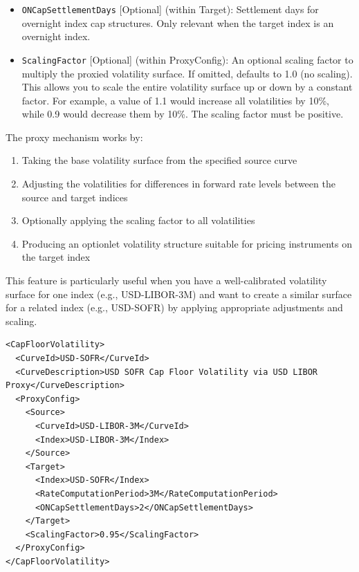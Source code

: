 \begin{itemize}
\item \lstinline!ONCapSettlementDays! [Optional] (within Target):
Settlement days for overnight index cap structures. Only relevant when the target index is an overnight index.

\item \lstinline!ScalingFactor! [Optional] (within ProxyConfig):
An optional scaling factor to multiply the proxied volatility surface. If omitted, defaults to 1.0 (no scaling). This allows you to scale the entire volatility surface up or down by a constant factor. For example, a value of 1.1 would increase all volatilities by 10\%, while 0.9 would decrease them by 10\%. The scaling factor must be positive.

\end{itemize}

The proxy mechanism works by:
\begin{enumerate}
\item Taking the base volatility surface from the specified source curve
\item Adjusting the volatilities for differences in forward rate levels between the source and target indices
\item Optionally applying the scaling factor to all volatilities
\item Producing an optionlet volatility structure suitable for pricing instruments on the target index
\end{enumerate}

This feature is particularly useful when you have a well-calibrated volatility surface for one index (e.g., USD-LIBOR-3M) and want to create a similar surface for a related index (e.g., USD-SOFR) by applying appropriate adjustments and scaling.

\begin{longlisting}
\begin{verbatim}
<CapFloorVolatility>
  <CurveId>USD-SOFR</CurveId>
  <CurveDescription>USD SOFR Cap Floor Volatility via USD LIBOR Proxy</CurveDescription>
  <ProxyConfig>
    <Source>
      <CurveId>USD-LIBOR-3M</CurveId>
      <Index>USD-LIBOR-3M</Index>
    </Source>
    <Target>
      <Index>USD-SOFR</Index>
      <RateComputationPeriod>3M</RateComputationPeriod>
      <ONCapSettlementDays>2</ONCapSettlementDays>
    </Target>
    <ScalingFactor>0.95</ScalingFactor>
  </ProxyConfig>
</CapFloorVolatility>
\end{verbatim}
\caption{Proxy cap floor volatility configuration with scaling factor.}
\label{lst:capfloorvol_proxy_configuration}
\end{longlisting}
